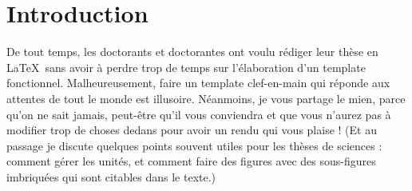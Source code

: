 \chapter*{Introduction}
\label{chapter:introduction}

De tout temps, les doctorants et doctorantes ont voulu rédiger leur thèse en \LaTeX $\,$ sans avoir à perdre trop de temps sur l'élaboration d'un template fonctionnel. Malheureusement, faire un template clef-en-main qui réponde aux attentes de tout le monde est illusoire. Néanmoins, je vous partage le mien, parce qu'on ne sait jamais, peut-être qu'il vous conviendra et que vous n'aurez pas à modifier trop de choses dedans pour avoir un rendu qui vous plaise ! (Et au passage je discute quelques points souvent utiles pour les thèses de sciences : comment gérer les unités, et comment faire des figures avec des sous-figures imbriquées qui sont citables dans le texte.)